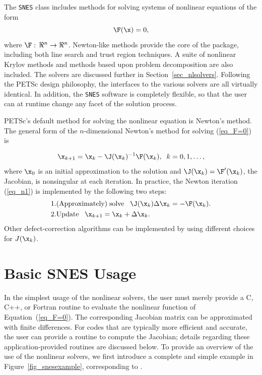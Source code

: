 The \lstinline{SNES} class includes methods for solving systems of nonlinear equations of the form
\begin{equation}
\F(\x) = 0,
\label{eq_F=0}
\end{equation}
where $\F: \, \Re^n \to \Re^n$.
Newton-like methods provide the core of the package, including
 both line search 
and trust region  techniques.  A suite of nonlinear Krylov
methods and methods based upon problem decomposition are also included.  The
solvers are discussed further in Section~\ref{sec_nlsolvers}. Following the
PETSc design philosophy, the interfaces to the various solvers are all virtually
identical. In addition, the \lstinline{SNES} software is completely flexible, so that the
user can at runtime change any facet of the solution process.

PETSc's default method for solving the nonlinear equation is Newton's method. The general form of the $n$-dimensional
Newton's method for solving (\ref{eq_F=0}) is

\begin{equation}
     \x_{k+1} = \x_k - \J(\x_k)^{-1} \F(\x_k), \;\; k=0,1, \ldots,
\label{eq_n1}
\end{equation}
where $ \x_0 $ is an initial approximation to the solution and
$ \J(\x_k) = \F'(\x_k) $, the Jacobian, is nonsingular at each iteration.
In practice, the Newton iteration (\ref{eq_n1}) is implemented by
the following two steps:
\begin{eqnarray}
  1. & {\rm (Approximately) \;solve\;\;\;} \J(\x_k) \Delta \x_k = -\F(\x_k).\\
  2. & {\rm Update\;\;\;} \x_{k+1} = \x_k + \Delta \x_k. \hspace{.225in}
\end{eqnarray}
Other defect-correction algorithms can be implemented by using different choices for $J(\x_k)$.

\section{Basic SNES Usage}
\label{sec_snesusage}

In the simplest usage of the nonlinear solvers, the user must merely
provide a C, C++, or Fortran routine to evaluate the nonlinear function
of Equation~(\ref{eq_F=0}).
The corresponding Jacobian  matrix
can be approximated with finite differences.
For codes that are typically more efficient and accurate, the
user can provide a routine to compute the Jacobian; details regarding these application-provided
routines are discussed below.
To provide an overview of the use of the nonlinear solvers,
we first introduce a complete and simple example in
Figure~\ref{fig_snesexample}, corresponding to
\href{https://www.mcs.anl.gov/petsc/petsc-current/src/snes/tutorials/ex1.c.html}{}.

